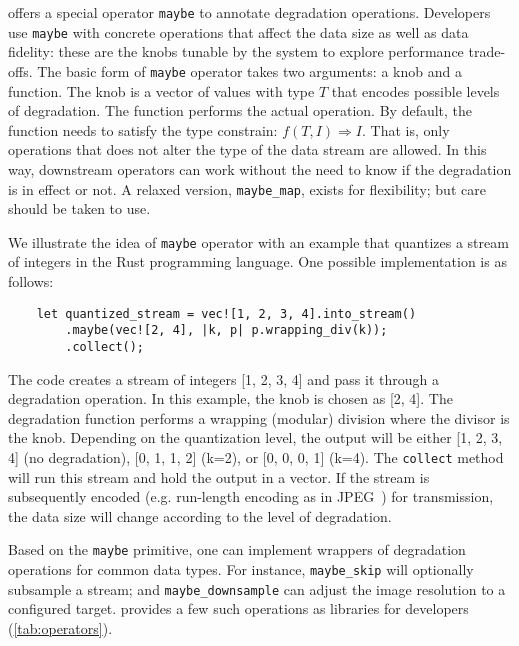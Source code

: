 \sysname{} offers a special operator \texttt{maybe} to annotate degradation
operations. Developers use \texttt{maybe} with concrete operations that affect
the data size as well as data fidelity: these are the knobs tunable by the
system to explore performance trade-offs. The basic form of \texttt{maybe}
operator takes two arguments: a knob and a function. The knob is a vector of
values with type $T$ that encodes possible levels of degradation. The function
performs the actual operation. By default, the function needs to satisfy the
type constrain: $f(T, I) \Rightarrow I$. That is, only operations that does not
alter the type of the data stream are allowed. In this way, downstream operators
can work without the need to know if the degradation is in effect or not.
 A relaxed version, \texttt{maybe\_map},
exists for flexibility; but care should be taken to use.

We illustrate the idea of \texttt{maybe} operator with an example that quantizes
a stream of integers in the Rust programming language. One possible
implementation is as follows:

\vspace{-2pt}
\begin{lstlisting}
    let quantized_stream = vec![1, 2, 3, 4].into_stream()
        .maybe(vec![2, 4], |k, p| p.wrapping_div(k));
        .collect();
\end{lstlisting}

The code creates a stream of integers [1, 2, 3, 4] and pass it through a
degradation operation. In this example, the knob is chosen as [2, 4]. The
degradation function performs a wrapping (modular) division where the divisor is
the knob. Depending on the quantization level, the output will be either [1, 2,
3, 4] (no degradation), [0, 1, 1, 2] (k=2), or [0, 0, 0, 1] (k=4). The
\texttt{collect} method will run this stream and hold the output in a vector.
If the stream is subsequently encoded (e.g. run-length encoding as in
JPEG~\cite{wallace1992jpeg}) for transmission, the data size will change
according to the level of degradation.

Based on the \texttt{maybe} primitive, one can implement wrappers of degradation
operations for common data types. For instance, \texttt{maybe\_skip} will
optionally subsample a stream; and \texttt{maybe\_downsample} can adjust the
image resolution to a configured target. \sysname{} provides a few such
operations as libraries for developers (\autoref{tab:operators}).

